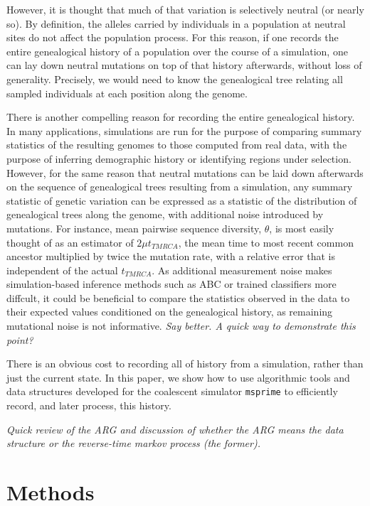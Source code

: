 \documentclass{article}
\newcommand{\msprime}{\texttt{msprime}}
\newcommand{\plr}[1]{{\em \color{blue} #1}}
\begin{document}
However, it is thought that much of that variation is selectively neutral (or nearly so).
By definition, the alleles carried by individuals in a population at neutral sites
do not affect the population process.
For this reason, if one records the entire genealogical history of a population over the course of a simulation,
one can lay down neutral mutations on top of that history afterwards,
without loss of generality.
Precisely, we would need to know the genealogical tree relating all sampled individuals
at each position along the genome.

There is another compelling reason for recording the entire genealogical history.
In many applications, simulations are run for the purpose of comparing summary statistics of the resulting genomes
to those computed from real data,
with the purpose of inferring demographic history or identifying regions under selection.
However, for the same reason that neutral mutations can be laid down afterwards on the sequence of genealogical trees resulting from a simulation,
any summary statistic of genetic variation can be expressed as a statistic of the distribution of genealogical trees along the genome,
with additional noise introduced by mutations.
For instance, mean pairwise sequence diversity, $\theta$,
is most easily thought of as an estimator of $2 \mu t_{TMRCA}$, the mean time to most recent common ancestor
multiplied by twice the mutation rate,
with a relative error that is independent of the actual $t_{TMRCA}$.
As additional measurement noise makes simulation-based inference methods such as ABC or trained classifiers more diffcult,
it could be beneficial to compare the statistics observed in the data
to their expected values conditioned on the genealogical history,
as remaining mutational noise is not informative.
\plr{Say better.  A quick way to demonstrate this point?}

There is an obvious cost to recording all of history from a simulation,
rather than just the current state.
In this paper, we show how to use algorithmic tools and data structures developed for the coalescent simulator \msprime
to efficiently record, and later process, this history.

\plr{Quick review of the ARG and discussion of whether the ARG means the data structure or the reverse-time markov process (the former).}

\section*{Methods}
\end{document}
